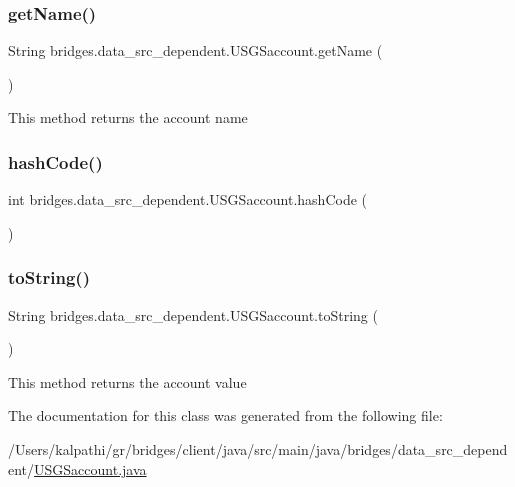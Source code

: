 \subsubsection{\texorpdfstring{get\+Name()}{getName()}}
{\footnotesize\ttfamily String bridges.\+data\+\_\+src\+\_\+dependent.\+U\+S\+G\+Saccount.\+get\+Name (\begin{DoxyParamCaption}{ }\end{DoxyParamCaption})}

This method returns the account name \mbox{\label{classbridges_1_1data__src__dependent_1_1_u_s_g_saccount_afe2cc53d7993aaf4424f42fb535c7ed1}} 
\subsubsection{\texorpdfstring{hash\+Code()}{hashCode()}}
{\footnotesize\ttfamily int bridges.\+data\+\_\+src\+\_\+dependent.\+U\+S\+G\+Saccount.\+hash\+Code (\begin{DoxyParamCaption}{ }\end{DoxyParamCaption})}

\mbox{\label{classbridges_1_1data__src__dependent_1_1_u_s_g_saccount_a832c5a4953a40fd3fa89243fcdabc435}} 
\subsubsection{\texorpdfstring{to\+String()}{toString()}}
{\footnotesize\ttfamily String bridges.\+data\+\_\+src\+\_\+dependent.\+U\+S\+G\+Saccount.\+to\+String (\begin{DoxyParamCaption}{ }\end{DoxyParamCaption})}

This method returns the account value 

The documentation for this class was generated from the following file\+:\begin{DoxyCompactItemize}
\item 
/\+Users/kalpathi/gr/bridges/client/java/src/main/java/bridges/data\+\_\+src\+\_\+dependent/\mbox{\hyperlink{_u_s_g_saccount_8java}{U\+S\+G\+Saccount.\+java}}\end{DoxyCompactItemize}
